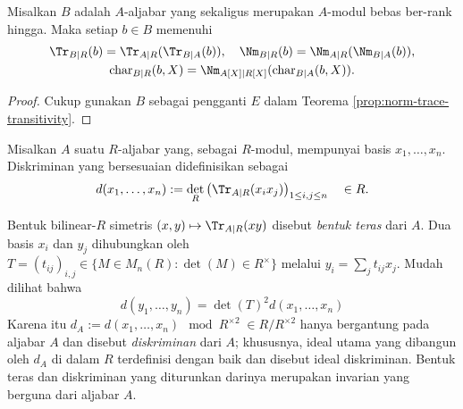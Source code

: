 \begin{corollary}\label{prop:norm-trace-transitivity-2}
	Misalkan $B$ adalah $A$-aljabar yang sekaligus merupakan $A$-modul bebas ber-rank hingga. Maka setiap $b \in B$ memenuhi
	\begin{gather*}
		\Tr_{B|R}(b) = \Tr_{A|R}(\Tr_{B|A}(b)), \quad \Nm_{B|R}(b) = \Nm_{A|R}(\Nm_{B|A}(b)), \\
		\mathrm{char}_{B|R}(b,X) = \Nm_{A[X]|R[X]}(\mathrm{char}_{B|A}(b,X)).
	\end{gather*}
\end{corollary}
\begin{proof}
	Cukup gunakan $B$ sebagai pengganti $E$ dalam Teorema \ref{prop:norm-trace-transitivity}.
\end{proof}

\begin{definition}\label{def:discriminant}
	Misalkan $A$ suatu $R$-aljabar yang, sebagai $R$-modul, mempunyai basis $x_1, \ldots, x_n$. Diskriminan yang bersesuaian didefinisikan sebagai
	\[ d(x_1, \ldots, x_n) := \det_R \left( \Tr_{A|R}(x_i x_j) \right)_{1 \leq i,j \leq n} \quad \in R. \]
\end{definition}
Bentuk bilinear-$R$ simetris $(x,y) \mapsto \Tr_{A|R}(xy)$ disebut \emph{bentuk teras} dari $A$. Dua basis $x_i$ dan $y_j$ dihubungkan oleh $T = (t_{ij})_{i,j} \in \{M \in M_n(R): \det(M) \in R^\times \}$ melalui $y_i = \sum_j t_{ij} x_j$. Mudah dilihat bahwa 
\[ d(y_1, \ldots, y_n) = \det(T)^2 d(x_1, \ldots, x_n) \]
Karena itu $d_A := d(x_1, \ldots, x_n) \mod R^{\times 2}\; \in R/R^{\times 2}$ hanya bergantung pada aljabar $A$ dan disebut \emph{diskriminan} dari $A$; khususnya, ideal utama yang dibangun oleh $d_A$ di dalam $R$ terdefinisi dengan baik dan disebut ideal diskriminan. Bentuk teras dan diskriminan yang diturunkan darinya merupakan invarian yang berguna dari aljabar $A$. 


